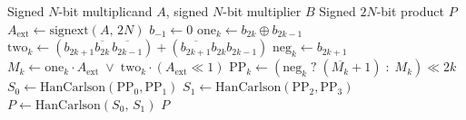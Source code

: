 \documentclass[conference]{IEEEtran}
\begin{document}
\begin{algorithm}[t]
\caption{Signed radix-4 MRPM with Han-Carlson accumulation}
\label{alg:mrpm}
\begin{algorithmic}[1]
\REQUIRE Signed $N$-bit multiplicand $A$, signed $N$-bit multiplier $B$
\ENSURE  Signed $2N$-bit product $P$
\STATE $A_{\mathrm{ext}} \leftarrow \mathrm{signext}(A,\, 2N)$
\STATE $b_{-1} \leftarrow 0$ 
    \STATE $\mathrm{one}_k \leftarrow b_{2k} \oplus b_{2k-1}$
    \STATE $\mathrm{two}_k \leftarrow
            (b_{2k+1}\overline{b_{2k}}\,\overline{b_{2k-1}}) +
            (\overline{b_{2k+1}}b_{2k}b_{2k-1})$
    \STATE $\mathrm{neg}_k \leftarrow b_{2k+1}$
    \STATE $M_k \leftarrow \mathrm{one}_k \cdot A_{\mathrm{ext}}
            \;\vee\; \mathrm{two}_k \cdot (A_{\mathrm{ext}} \ll 1)$
    \STATE $\mathrm{PP}_k \leftarrow
            (\mathrm{neg}_k \;?\; (\overline{M_k}+1) \;:\; M_k) \ll 2k$
\ENDFOR
\STATE $S_0 \leftarrow \mathrm{HanCarlson}(\mathrm{PP}_0,\mathrm{PP}_1)$
\STATE $S_1 \leftarrow \mathrm{HanCarlson}(\mathrm{PP}_2,\mathrm{PP}_3)$
\STATE $P   \leftarrow \mathrm{HanCarlson}(S_0,\, S_1)$
\RETURN $P$
\end{algorithmic}
\end{algorithm}
\end{document}
